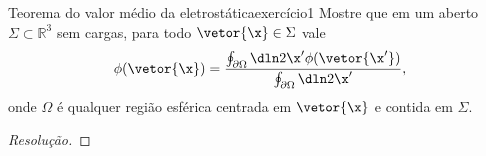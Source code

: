 \begin{exercício}{Teorema do valor médio da eletrostática}{exercício1}
    Mostre que em um aberto \(\Sigma\subset \mathbb{R}^3\) sem cargas, para todo \(\vetor{\x} \in \Sigma\) vale
    \begin{equation*}
        \phi(\vetor{\x}) = \frac{\oint_{\partial \Omega}\dln2{\x'} \phi(\vetor{\x'})}{\oint_{\partial \Omega} \dln2{\x'}},
    \end{equation*}
    onde \(\Omega\) é qualquer região esférica centrada em \(\vetor{\x}\) e contida em \(\Sigma\).
\end{exercício}
\begin{proof}[Resolução]

\end{proof}
